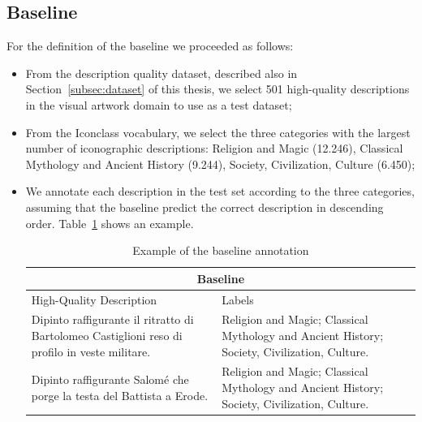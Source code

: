 \documentclass[epsfig,a4paper,12pt,titlepage]{book}
\begin{document}
\subsection{Baseline}

For the definition of the baseline we proceeded as follows:
  
\begin{itemize}
     \item From the description quality dataset, described also in Section~\ref{subsec:dataset} of this thesis, we select 501 high-quality descriptions in the visual artwork domain to use as a test dataset;
    \item From the Iconclass vocabulary, we select the three categories with the largest number of iconographic descriptions: Religion and Magic (12.246), Classical Mythology and Ancient History (9.244), Society, Civilization, Culture (6.450); 
    \item We annotate each description in the test set according to the three categories, assuming that the baseline predict the correct description in descending order. Table~\ref{tab:baseline_annotation} shows an example.
    
    \begin{table}[H]
    \small 
\centering
\begin{adjustbox}{width=\textwidth}
\begin{tabular}{|p{8cm}|p{8cm}|} \hline

  \hline
  \multicolumn{2}{|c|}{Baseline} \\
  \hline
    High-Quality Description  & Labels  \\ \hline
    Dipinto raffigurante il ritratto di Bartolomeo Castiglioni reso di profilo in veste militare. & Religion and Magic; Classical Mythology and Ancient History; Society, Civilization, Culture. \\ \hline
    Dipinto raffigurante Salom\'e che porge la testa del Battista a Erode. & Religion and Magic; Classical Mythology and Ancient History; Society, Civilization, Culture. \\ \hline
    
    \hline
\end{tabular}
\end{adjustbox}
    \caption{Example of the baseline annotation}
		\label{tab:baseline_annotation}       %
\end{table}


\end{itemize}
\end{document}
